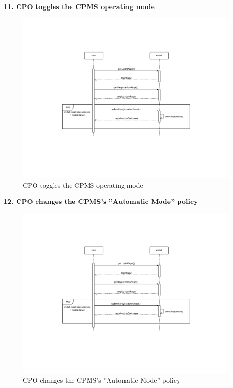 \documentclass[11pt]{article}
\begin{document}
\begin{description}
    \item \textbf{11. CPO toggles the CPMS operating mode}
    \begin{figure}[!ht]
        \centering
        \includegraphics[page={11}, trim=5cm 9cm 5.7cm 3.5cm, width=0.8\linewidth, clip]{SequenceDiagrams.pdf}
        \caption{CPO toggles the CPMS operating mode}
    \end{figure}
    
    \item \textbf{12. CPO changes the CPMS’s ”Automatic Mode” policy}
    \begin{figure}[!ht]
        \centering
        \includegraphics[page={12}, trim=4.4cm 4.4cm 5.4cm 4.4cm, width=0.8\linewidth, clip]{SequenceDiagrams.pdf}
        \caption{CPO changes the CPMS’s ”Automatic Mode” policy}
    \end{figure}
\end{description}
\end{document}

